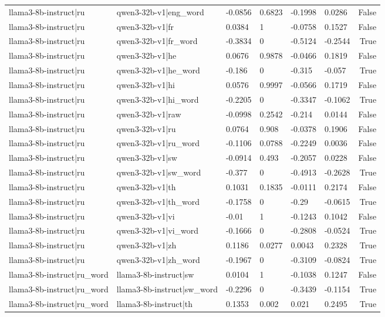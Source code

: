 \begin{table}
\begin{tabular}{llllllr}
llama3-8b-instruct|ru & qwen3-32b-v1|eng_word & -0.0856 & 0.6823 & -0.1998 & 0.0286 & False \\
llama3-8b-instruct|ru & qwen3-32b-v1|fr & 0.0384 & 1 & -0.0758 & 0.1527 & False \\
llama3-8b-instruct|ru & qwen3-32b-v1|fr_word & -0.3834 & 0 & -0.5124 & -0.2544 & True \\
llama3-8b-instruct|ru & qwen3-32b-v1|he & 0.0676 & 0.9878 & -0.0466 & 0.1819 & False \\
llama3-8b-instruct|ru & qwen3-32b-v1|he_word & -0.186 & 0 & -0.315 & -0.057 & True \\
llama3-8b-instruct|ru & qwen3-32b-v1|hi & 0.0576 & 0.9997 & -0.0566 & 0.1719 & False \\
llama3-8b-instruct|ru & qwen3-32b-v1|hi_word & -0.2205 & 0 & -0.3347 & -0.1062 & True \\
llama3-8b-instruct|ru & qwen3-32b-v1|raw & -0.0998 & 0.2542 & -0.214 & 0.0144 & False \\
llama3-8b-instruct|ru & qwen3-32b-v1|ru & 0.0764 & 0.908 & -0.0378 & 0.1906 & False \\
llama3-8b-instruct|ru & qwen3-32b-v1|ru_word & -0.1106 & 0.0788 & -0.2249 & 0.0036 & False \\
llama3-8b-instruct|ru & qwen3-32b-v1|sw & -0.0914 & 0.493 & -0.2057 & 0.0228 & False \\
llama3-8b-instruct|ru & qwen3-32b-v1|sw_word & -0.377 & 0 & -0.4913 & -0.2628 & True \\
llama3-8b-instruct|ru & qwen3-32b-v1|th & 0.1031 & 0.1835 & -0.0111 & 0.2174 & False \\
llama3-8b-instruct|ru & qwen3-32b-v1|th_word & -0.1758 & 0 & -0.29 & -0.0615 & True \\
llama3-8b-instruct|ru & qwen3-32b-v1|vi & -0.01 & 1 & -0.1243 & 0.1042 & False \\
llama3-8b-instruct|ru & qwen3-32b-v1|vi_word & -0.1666 & 0 & -0.2808 & -0.0524 & True \\
llama3-8b-instruct|ru & qwen3-32b-v1|zh & 0.1186 & 0.0277 & 0.0043 & 0.2328 & True \\
llama3-8b-instruct|ru & qwen3-32b-v1|zh_word & -0.1967 & 0 & -0.3109 & -0.0824 & True \\
llama3-8b-instruct|ru_word & llama3-8b-instruct|sw & 0.0104 & 1 & -0.1038 & 0.1247 & False \\
llama3-8b-instruct|ru_word & llama3-8b-instruct|sw_word & -0.2296 & 0 & -0.3439 & -0.1154 & True \\
llama3-8b-instruct|ru_word & llama3-8b-instruct|th & 0.1353 & 0.002 & 0.021 & 0.2495 & True \\

\end{tabular}
\end{table}
